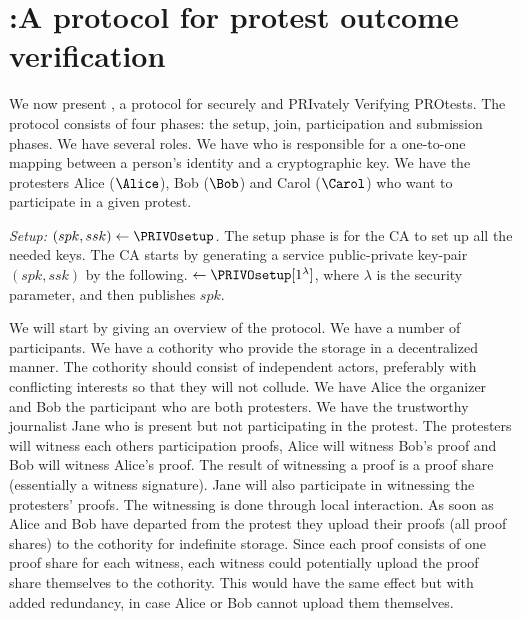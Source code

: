 \section{\PRIVO:\@ A protocol for protest outcome verification}%
\label{protocol}



We now present \PRIVO, a protocol for securely and PRIvately Verifying PROtests.
The protocol consists of four phases: the setup, join, participation and 
submission phases.
We have several roles.
We have  who is responsible for a one-to-one mapping between a person's 
identity and a cryptographic key.
We have the protesters Alice (\(\Alice\)), Bob (\(\Bob\)) and Carol (\(\Carol\)) 
who want to participate in a given protest.

\emph{Setup: \((spk, ssk)\gets \PRIVOsetup\).}
The setup phase is for the \ac{CA} to set up all the needed keys.
The \ac{CA} starts by generating a service public-private key-pair \((spk, 
  ssk)\) by the following.
\(\gets \PRIVOsetup[1^\lambda]\), where \(\lambda\) is the security parameter, 
and then publishes \(spk\).
\begin{algorithmic}
  \EndFunction
\end{algorithmic}

We will start by giving an overview of the protocol.
We have a number of participants.
We have a cothority who provide the storage in a decentralized manner.
The cothority should consist of independent actors, preferably with conflicting 
interests so that they will not collude.
We have Alice the organizer and Bob the participant who are both protesters.
We have the trustworthy journalist Jane who is present but not participating in 
the protest.
The protesters will witness each others participation proofs, \eg Alice will 
witness Bob's proof and Bob will witness Alice's proof.
The result of witnessing a proof is a proof share (essentially a witness 
signature).
Jane will also participate in witnessing the protesters' proofs.
The witnessing is done through local interaction.
As soon as Alice and Bob have departed from the protest they upload their proofs 
(\ie all proof shares) to the cothority for indefinite storage.
Since each proof consists of one proof share for each witness, each witness 
could potentially upload the proof share themselves to the cothority.
This would have the same effect but with added redundancy, in case Alice or Bob 
cannot upload them themselves.

